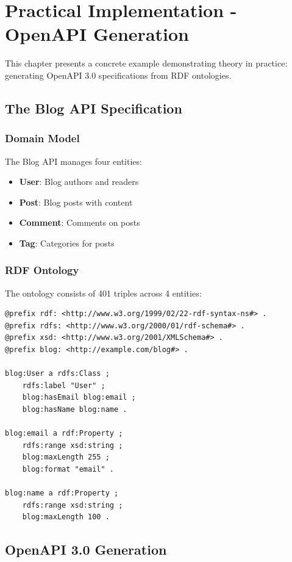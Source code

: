 \chapter{Practical Implementation - OpenAPI Generation}

This chapter presents a concrete example demonstrating theory in practice: generating OpenAPI 3.0 specifications from RDF ontologies.

\section{The Blog API Specification}

\subsection{Domain Model}

The Blog API manages four entities:
\begin{itemize}
    \item \textbf{User}: Blog authors and readers
    \item \textbf{Post}: Blog posts with content
    \item \textbf{Comment}: Comments on posts
    \item \textbf{Tag}: Categories for posts
\end{itemize}

\subsection{RDF Ontology}

The ontology consists of 401 triples across 4 entities:

\begin{verbatim}
@prefix rdf: <http://www.w3.org/1999/02/22-rdf-syntax-ns#> .
@prefix rdfs: <http://www.w3.org/2000/01/rdf-schema#> .
@prefix xsd: <http://www.w3.org/2001/XMLSchema#> .
@prefix blog: <http://example.com/blog#> .

blog:User a rdfs:Class ;
    rdfs:label "User" ;
    blog:hasEmail blog:email ;
    blog:hasName blog:name .

blog:email a rdf:Property ;
    rdfs:range xsd:string ;
    blog:maxLength 255 ;
    blog:format "email" .

blog:name a rdf:Property ;
    rdfs:range xsd:string ;
    blog:maxLength 100 .
\end{verbatim}

\section{OpenAPI 3.0 Generation}

